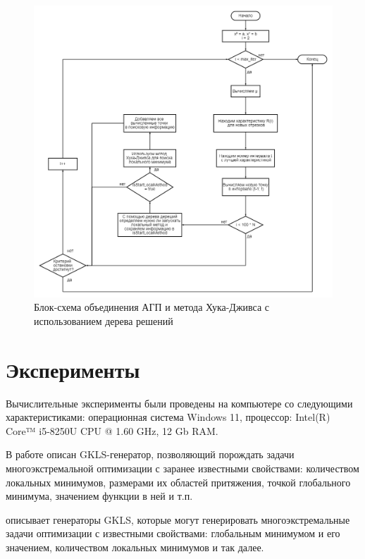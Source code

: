 \documentclass[12pt, a4paper, russian]{article}
\begin{document}
\begin{figure}[ht!]

	\begin{center}
		\begin{minipage}[h]{0.9\linewidth}
			\includegraphics[width=1\linewidth]{figure/fig3.png}
			\caption{Блок-схема объединения АГП и метода Хука-Дживса с использованием дерева решений} %
			\label{fig:fig3}
		\end{minipage}
	\end{center}
\end{figure}	

\section{Эксперименты}

Вычислительные эксперименты были проведены на компьютере со следующими характеристиками: операционная система Windows 11, процессор: Intel(R) Core™ i5-8250U CPU @ 1.60 GHz, 12 Gb RAM.

В работе \cite{fio_bib13, fio_bib17} описан GKLS-генератор, позволяющий порождать задачи многоэкстремальной оптимизации с заранее известными свойствами: количеством локальных минимумов, размерами их областей притяжения, точкой глобального минимума, значением функции в ней и т.п.


\cite{fio_bib13, fio_bib17} описывает генераторы GKLS, которые могут генерировать многоэкстремальные задачи оптимизации с известными свойствами: глобальным минимумом и его значением, количеством локальных минимумов и так далее.
\end{document}
